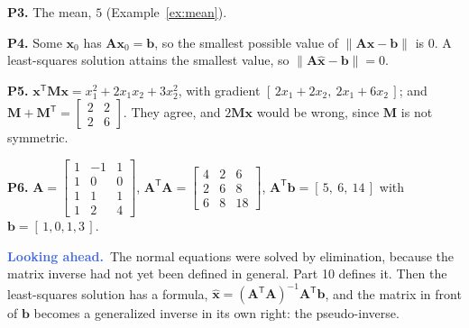 \documentclass[11pt]{article}
\theoremstyle{plain}
\theoremstyle{definition}
\theoremstyle{remark}
\newcommand{\lookahead}{\par\smallskip\noindent
  \textbf{\sffamily\textcolor{RoyalBlue}{Looking ahead.}}\ \ignorespaces}
\newcommand{\vc}[1]{\mathbf{#1}}
\newcommand{\mt}[1]{\mathbf{#1}}
\newcommand{\norm}[1]{\lVert #1\rVert}
\newcommand{\T}{^{\mathsf{T}}}
\newcommand{\xh}{\hat{\vc{x}}}
\begin{document}
\smallskip
\noindent\textbf{P3.} The mean, $5$ (Example~\ref{ex:mean}).

\smallskip
\noindent\textbf{P4.} Some $\vc{x}_0$ has $\mt{A}\vc{x}_0=\vc{b}$, so the
smallest possible value of $\norm{\mt{A}\vc{x}-\vc{b}}$ is $0$. A least-squares
solution attains the smallest value, so $\norm{\mt{A}\xh-\vc{b}}=0$.

\smallskip
\noindent\textbf{P5.} $\vc{x}\T\mt{M}\vc{x}=x_1^{2}+2x_1x_2+3x_2^{2}$, with
gradient $[\,2x_1+2x_2,\ 2x_1+6x_2\,]$; and
$\mt{M}+\mt{M}\T=\begin{bmatrix}2&2\\2&6\end{bmatrix}$. They agree, and $2\mt{M}\vc{x}$
would be wrong, since $\mt{M}$ is not symmetric.

\smallskip
\noindent\textbf{P6.} $\mt{A}=\begin{bmatrix}1&-1&1\\1&0&0\\1&1&1\\1&2&4\end{bmatrix}$,
$\mt{A}\T\mt{A}=\begin{bmatrix}4&2&6\\2&6&8\\6&8&18\end{bmatrix}$,
$\mt{A}\T\vc{b}=[\,5,\ 6,\ 14\,]$ with $\vc{b}=[\,1,0,1,3\,]$.

\lookahead The normal equations were solved by elimination, because the matrix
inverse had not yet been defined in general. Part 10 defines it. Then the
least-squares solution has a formula, $\xh=(\mt{A}\T\mt{A})^{-1}\mt{A}\T\vc{b}$,
and the matrix in front of $\vc{b}$ becomes a generalized inverse in its own
right: the pseudo-inverse.
\end{document}
